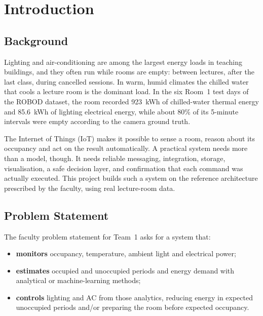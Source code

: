 \documentclass[12pt,a4paper,oneside]{report}
\begin{document}
\clearpage
{}
\setcounter{page}{1}
\pagestyle{fancy}

\chapter{Introduction}

\section{Background}
Lighting and air-conditioning are among the largest energy loads in teaching buildings, and they often run while
rooms are empty: between lectures, after the last class, during cancelled sessions. In warm, humid climates the
chilled water that cools a lecture room is the dominant load. In the six Room~1 test days of the ROBOD dataset, the
room recorded 923~kWh of chilled-water thermal energy and 85.6~kWh of lighting electrical energy, while about 80\% of
its 5-minute intervals were empty according to the camera ground truth.

The Internet of Things (IoT) makes it possible to sense a room, reason about its occupancy and act on the result
automatically. A practical system needs more than a model, though. It needs reliable messaging, integration,
storage, visualisation, a safe decision layer, and confirmation that each command was actually executed. This
project builds such a system on the reference architecture prescribed by the faculty, using real lecture-room data.

\section{Problem Statement}
The faculty problem statement for Team~1 asks for a system that:
\begin{itemize}
\item \textbf{monitors} occupancy, temperature, ambient light and electrical power;
\item \textbf{estimates} occupied and unoccupied periods and energy demand with analytical or machine-learning
  methods;
\item \textbf{controls} lighting and AC from those analytics, reducing energy in expected unoccupied periods and/or
  preparing the room before expected occupancy.
\end{itemize}
\end{document}
